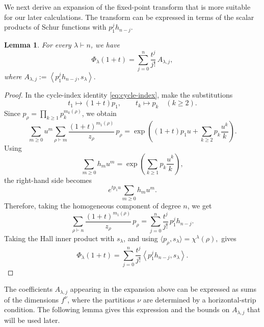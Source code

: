 \documentclass[12pt]{article}
\newtheorem{lemma}{Lemma}[section]
\theoremstyle{definition}
\newcommand{\1}{\mathbf 1}
\begin{document}
We next derive an expansion of the fixed-point transform that is more suitable for our later calculations. The transform can be expressed in terms of the scalar products of Schur functions with $p_1^j h_{n-j}$.




\begin{lemma}\label{lem:Phi_lambda_series_expansion}
For every $\lambda\vdash n$, we have
\begin{equation}
\Phi_\lambda(1+t)
=
\sum_{j=0}^{n}
\frac{t^j}{j!}\,A_{\lambda,j},
\label{eq:Phi-power-expansion}
\end{equation}
where $A_{\lambda,j}
:=
\left\langle p_1^j h_{n-j},s_\lambda\right\rangle.$
\end{lemma}

\begin{proof}
In the cycle-index identity \eqref{eq:cycle-index}, make the substitutions
$$
t_1\longmapsto (1+t)p_1,
\qquad
t_k\longmapsto p_k
\quad (k\geq 2).
$$
Since $p_\rho=\prod_{k\geq 1}p_k^{m_k(\rho)}$, we obtain
$$
\sum_{m\geq 0}u^m
\sum_{\rho\vdash m}
\frac{(1+t)^{m_1(\rho)}}{z_\rho}\,p_\rho
=
\exp\left(
(1+t)p_1u+
\sum_{k\geq 2}p_k\frac{u^k}{k}
\right).
$$
Using
$$
\sum_{m\geq 0}h_mu^m
=
\exp\left(
\sum_{k\geq 1}p_k\frac{u^k}{k}
\right),
$$
the right-hand side becomes
$$
e^{tp_1u}\sum_{m\geq 0}h_mu^m.
$$
Therefore, taking the homogeneous component of degree $n$, we get
$$
\sum_{\rho\vdash n}
\frac{(1+t)^{m_1(\rho)}}{z_\rho}\,p_\rho
=
\sum_{j=0}^{n}
\frac{t^j}{j!}\,p_1^j h_{n-j}.
$$
Taking the Hall inner product with $s_\lambda$, and using $
\langle p_\rho,s_\lambda\rangle
=
\chi^\lambda(\rho),
$ gives
$$\Phi_\lambda(1+t)=\sum_{j=0}^{n}\frac{t^j}{j!}\left\langle p_1^j h_{n-j},s_\lambda\right\rangle.$$
\end{proof}

The coefficients $A_{\lambda,j}$ appearing in the expansion above can be expressed as sums of the dimensions $f^\nu$, where the partitions $\nu$ are determined by a horizontal-strip condition. The following lemma gives this expression and the bounds on $A_{\lambda,j}$ that will be used later.
\end{document}
